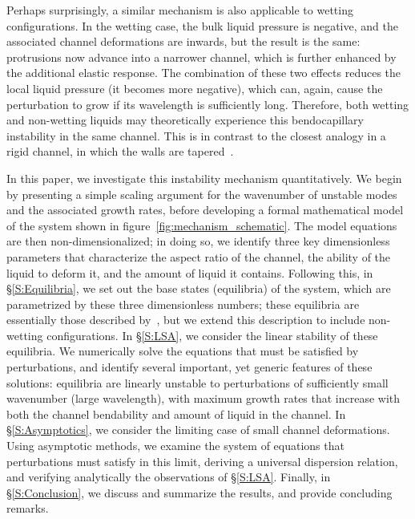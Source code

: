 \documentclass{jfm}
\begin{document}
Perhaps surprisingly, a similar mechanism is also applicable to wetting configurations. In the wetting case, the bulk liquid pressure is negative, and the associated channel deformations are inwards, but the result is the same: protrusions now advance into a narrower channel, which is further enhanced by the additional elastic response. The combination of these two effects reduces the local liquid pressure (it becomes more negative), which can, again, cause the perturbation to grow if its wavelength is sufficiently long. Therefore, both wetting and non-wetting liquids may theoretically experience this bendocapillary instability in the same channel. This is in contrast to the closest analogy in a rigid channel, in which the walls are tapered~\cite{AlHousseiny2012NaturePhysics}. %

In this paper, we investigate this instability mechanism quantitatively. We begin by presenting a simple scaling argument for the wavenumber of unstable modes and the associated growth rates, before developing a formal mathematical model of the system shown in figure~\ref{fig:mechanism_schematic}. The model equations are then non-dimensionalized; in doing so, we identify three key dimensionless parameters that characterize the aspect ratio of the channel, the ability of the liquid to deform it, and the amount of liquid it contains. Following this, in \S\ref{S:Equilibria}, we set out the base states (equilibria) of the system, which are parametrized by these three dimensionless numbers; these equilibria are essentially those described by~\citet{Taroni2012JFM}, but we extend this description to include non-wetting configurations. In \S\ref{S:LSA}, we consider the linear stability of these equilibria. We numerically solve the equations that must be satisfied by perturbations, and identify several important, yet generic features of these solutions: equilibria are linearly unstable to perturbations of sufficiently small wavenumber (large wavelength), with maximum growth rates that increase with both the channel bendability and amount of liquid in the channel. In \S\ref{S:Asymptotics}, we consider the limiting case of small channel deformations. Using asymptotic methods, we examine the system of equations that perturbations must satisfy in this limit, deriving a universal dispersion relation, and verifying analytically the observations of \S\ref{S:LSA}. Finally, in \S\ref{S:Conclusion}, we discuss and summarize the results, and provide concluding remarks.
\end{document}
